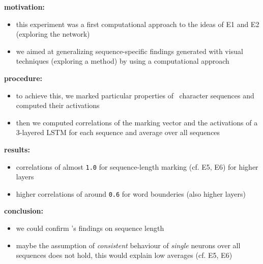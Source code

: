 \begin{frame}{\expiv}
	\textbf{motivation:}
	\begin{itemize}
		\item this experiment was a first computational approach to the ideas of E1 and E2 (exploring the network)
		\item we aimed at generalizing sequence-specific findings generated with visual techniques (exploring a method) by using a computational approach
	\end{itemize}
	\textbf{procedure:}
	\begin{itemize}
		\item to achieve this, we marked particular properties of \kj~character sequences and computed their activations
		\item then we computed correlations of the marking vector and the activations of a 3-layered LSTM for each sequence and average over all sequences
	\end{itemize}
\end{frame}
\begin{frame}{\expiv}
	\textbf{results:}
	\begin{itemize}
		\item correlations of almost \texttt{1.0} for sequence-length marking (cf. E5, E6) for higher layers
		\item higher correlations of around \texttt{0.6} for word bounderies (also higher layers)
	\end{itemize}
	\textbf{conclusion:}
	\begin{itemize}
		\item we could confirm \citeauthor{karpathy2015visualizing}'s findings on sequence length
		\item maybe the assumption of \textit{consistent} behaviour of \textit{single} neurons over all sequences does not hold, this would explain low averages (cf. E5, E6)
	\end{itemize}
\end{frame}